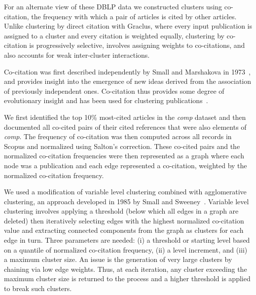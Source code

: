 For an alternate view of these DBLP data we constructed clusters using co-citation, the frequency with which a pair of articles is cited by other articles. 
Unlike clustering by direct citation with Graclus, where every input publication is assigned to a cluster and every citation is weighted equally, clustering by co-citation is progressively selective, involves assigning weights to co-citations, and also accounts for weak inter-cluster interactions. 

Co-citation was first described independently by Small and Marshakova in 1973~\cite{small_co-citation_1973,marshakova-shaikevich_co-citation_1973}, and provides insight into the emergence of new ideas derived from the association of previously independent ones.  Co-citation thus provides some degree of evolutionary insight and has been used for clustering publications~\cite{boyack_cocitation_2010,boyack_improving_2013,small_structure_1974,small_clustering_1985}. 

We first identified the top 10\% most-cited articles in the \emph{comp} dataset and then documented all co-cited pairs of their cited references that were also elements of \emph{comp}. The frequency of co-citation was then computed across all records in Scopus and normalized using Salton's correction. These co-cited pairs and the normalized co-citation frequencies were then represented as a graph where each node was a publication and each edge represented a co-citation, weighted by the normalized co-citation frequency.   




We used a modification of variable level clustering combined with agglomerative clustering, an approach developed in 1985 by Small and Sweeney~\cite{small_clustering_1985}. Variable level clustering involves applying a threshold (below which all edges in a graph are deleted) then iteratively selecting edges with the highest normalized co-citation value and extracting connected components from the graph as clusters for each edge in turn. Three parameters are needed: (i) a threshold or starting level based on a quantile of normalized co-citation frequency, (ii) a level increment, and (iii) a maximum cluster size. An issue is the generation of very large clusters by chaining via low edge weights.  Thus, at each iteration, any cluster exceeding the maximum cluster size  is returned to the process and a higher threshold is applied to break such clusters.

